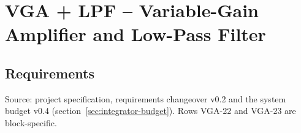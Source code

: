 
\chapter{VGA + LPF -- Variable-Gain Amplifier and Low-Pass Filter}
\label{ch:vga}


\section{Requirements}
Source: project specification, requirements changeover v0.2 and the system budget v0.4
(section~\ref{sec:integrator-budget}). Rows VGA-22 and VGA-23 are block-specific.

